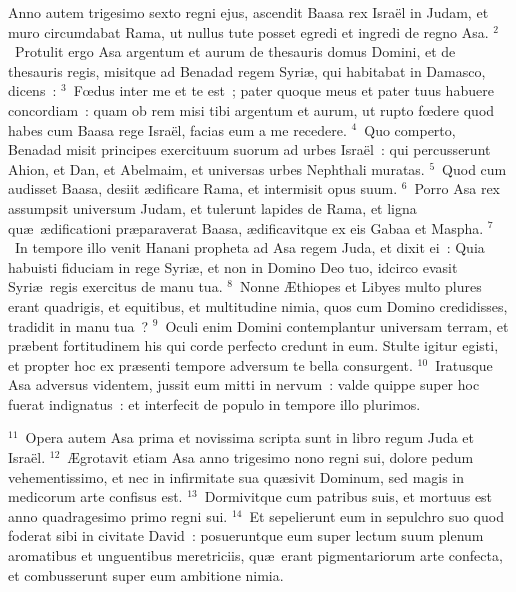 \bchapter
\lettrine[lines=3,image=true,loversize=0.05,lraise=-0.03]{A}{}nno autem trigesimo sexto regni ejus, ascendit Baasa rex Isra\"el in Judam, et muro circumdabat Rama, ut nullus tute posset egredi et ingredi de regno Asa.
${}^{2}$~Protulit ergo Asa argentum et aurum de thesauris domus Domini, et de thesauris regis, misitque ad Benadad regem Syri\ae , qui habitabat in Damasco, dicens~:
${}^{3}$~Fœdus inter me et te est~; pater quoque meus et pater tuus habuere concordiam~: quam ob rem misi tibi argentum et aurum, ut rupto fœdere quod habes cum Baasa rege Isra\"el, facias eum a me recedere.
${}^{4}$~Quo comperto, Benadad misit principes exercituum suorum ad urbes Isra\"el~: qui percusserunt Ahion, et Dan, et Abelmaim, et universas urbes Nephthali muratas.
${}^{5}$~Quod cum audisset Baasa, desiit \ae dificare Rama, et intermisit opus suum.
${}^{6}$~Porro Asa rex assumpsit universum Judam, et tulerunt lapides de Rama, et ligna qu\ae\ \ae dificationi pr\ae paraverat Baasa, \ae dificavitque ex eis Gabaa et Maspha.
${}^{7}$~In tempore illo venit Hanani propheta ad Asa regem Juda, et dixit ei~: Quia habuisti fiduciam in rege Syri\ae , et non in Domino Deo tuo, idcirco evasit Syri\ae\ regis exercitus de manu tua.
${}^{8}$~Nonne \AE thiopes et Libyes multo plures erant quadrigis, et equitibus, et multitudine nimia, quos cum Domino credidisses, tradidit in manu tua~?
${}^{9}$~Oculi enim Domini contemplantur universam terram, et pr\ae bent fortitudinem his qui corde perfecto credunt in eum. Stulte igitur egisti, et propter hoc ex pr\ae senti tempore adversum te bella consurgent.
${}^{10}$~Iratusque Asa adversus videntem, jussit eum mitti in nervum~: valde quippe super hoc fuerat indignatus~: et interfecit de populo in tempore illo plurimos.


${}^{11}$~Opera autem Asa prima et novissima scripta sunt in libro regum Juda et Isra\"el.
${}^{12}$~\AE grotavit etiam Asa anno trigesimo nono regni sui, dolore pedum vehementissimo, et nec in infirmitate sua qu\ae sivit Dominum, sed magis in medicorum arte confisus est.
${}^{13}$~Dormivitque cum patribus suis, et mortuus est anno quadragesimo primo regni sui.
${}^{14}$~Et sepelierunt eum in sepulchro suo quod foderat sibi in civitate David~: posueruntque eum super lectum suum plenum aromatibus et unguentibus meretriciis, qu\ae\ erant pigmentariorum arte confecta, et combusserunt super eum ambitione nimia.

